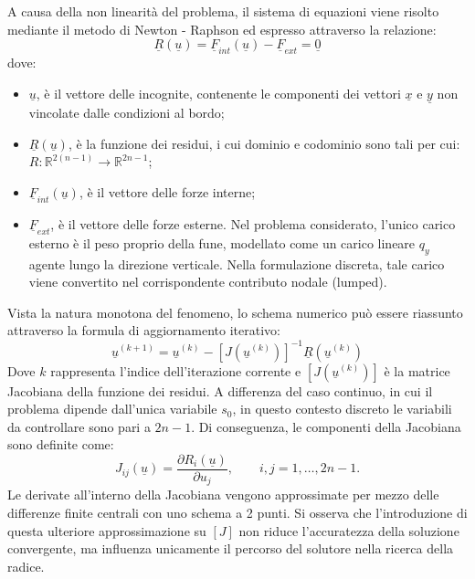 \vspace{1em}
A causa della non linearità del problema, il sistema di equazioni viene risolto mediante il metodo di Newton - Raphson ed espresso attraverso la relazione: 
\begin{equation}
 \underline{R}(\underline{u}) = \underline{F}_{int}(\underline{u}) - \underline{F}_{ext} = \underline{0}
 \label{eq:sistema_equazioni}
\end{equation}
dove:
\begin{itemize}
   \item  $\underline{u}$, è il vettore delle incognite, contenente le componenti dei vettori $\underline{x}$ e $\underline{y}$ non vincolate dalle condizioni al bordo; 
   \item  $\underline{R}(\underline{u})$, è la funzione dei residui, i cui dominio e codominio sono tali per cui: $R : \mathbb{R}^{2(n-1)} \rightarrow \mathbb{R}^{2n-1}$;
   \item  $\underline{F}_{int}(\underline{u})$, è il vettore delle forze interne;
   \item  $\underline{F}_{ext}$, è il vettore delle forze esterne. Nel problema considerato, l'unico carico esterno è il peso proprio della fune, modellato come un carico lineare $q_y$ agente lungo la direzione verticale. Nella formulazione discreta, tale carico viene convertito nel corrispondente contributo nodale (lumped).  
\end{itemize}
Vista la natura monotona del fenomeno, lo schema numerico può essere riassunto attraverso la formula di aggiornamento iterativo:
\begin{equation}
 \underline{u}^{(k+1)} = \underline{u}^{(k)} - [J (\underline{u}^{(k)})]^{-1} \underline{R}(\underline{u}^{(k)})
 \label{eq:ricorrenza_newton_raphson}
\end{equation}
Dove $k$ rappresenta l'indice dell'iterazione corrente e $[J(\underline{u}^{(k)})]$ è la matrice Jacobiana della funzione dei residui. A differenza del caso continuo, in cui il problema dipende dall'unica variabile $s_0$, in questo contesto discreto le variabili da controllare sono pari a $2n - 1$. Di conseguenza, le componenti della Jacobiana sono definite come: 
\begin{equation}
J_{ij}(\underline{u}) = \frac{\partial R_i(\underline{u})}{\partial u_j},
\qquad i,j = 1,\dots,2n-1.
\label{eq:jacobiana_componenti}
\end{equation}
Le derivate all'interno della Jacobiana vengono approssimate per mezzo delle differenze finite centrali con uno schema a 2 punti. Si osserva che l'introduzione di questa ulteriore approssimazione su $[J]$ non riduce l'accuratezza della soluzione convergente, ma influenza unicamente il percorso del solutore nella ricerca della radice.

